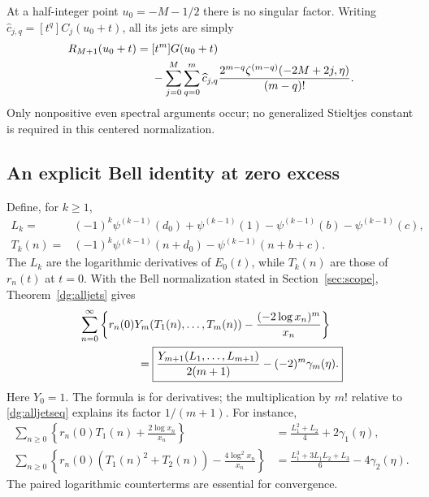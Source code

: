 At a half-integer point $u_0=-M-1/2$ there is no singular factor.
Writing $\widehat c_{j,q}=[t^q]C_j(u_0+t)$, all its jets are simply
\begin{align}
 [t^m]R_{M+1}(u_0+t)
 ={}&[t^m]G(u_0+t)\notag\\
 &-\sum_{j=0}^{M}\sum_{q=0}^{m}\widehat c_{j,q}
       \frac{2^{m-q}\zeta^{(m-q)}(-2M+2j,\eta)}{(m-q)!}.
 \label{dg:halfjets}
\end{align}
Only nonpositive even spectral arguments occur; no generalized
Stieltjes constant is required in this centered normalization.

\subsection{An explicit Bell identity at zero excess}
Define, for $k\ge1$,
\begin{align}
 L_k={}&(-1)^k\psi^{(k-1)}(d_0)+\psi^{(k-1)}(1)
                    -\psi^{(k-1)}(b)-\psi^{(k-1)}(c),
                    \label{dg:Lk}\\
 T_k(n)={}&(-1)^k\psi^{(k-1)}(n+d_0)
                    -\psi^{(k-1)}(n+b+c).
                    \label{dg:Tk}
\end{align}
The $L_k$ are the logarithmic derivatives of $E_0(t)$, while $T_k(n)$
are those of $r_n(t)$ at $t=0$. With the Bell normalization stated
in Section~\ref{sec:scope}, Theorem~\ref{dg:alljets} gives
\begin{align}
 &\sum_{n=0}^{\infty}\left\{
 r_n(0)Y_m(T_1(n),\ldots,T_m(n))
              -\frac{(-2\log x_n)^m}{x_n}\right\}\notag\\
 &\hspace{18mm}=
 \boxed{\frac{Y_{m+1}(L_1,\ldots,L_{m+1})}{2(m+1)}
              -(-2)^m\gamma_m(\eta).}\label{dg:Bellzero}
\end{align}
Here $Y_0=1$. The formula is for derivatives; the multiplication by
$m!$ relative to \eqref{dg:alljetseq} explains its factor $1/(m+1)$.
For instance,
\begin{align}
 \sum_{n\ge0}\left\{r_n(0)T_1(n)+\frac{2\log x_n}{x_n}\right\}
 &=\frac{L_1^2+L_2}{4}+2\gamma_1(\eta),\label{dg:Bellone}\\
 \sum_{n\ge0}\left\{r_n(0)(T_1(n)^2+T_2(n))
                    -\frac{4\log^2x_n}{x_n}\right\}
 &=\frac{L_1^3+3L_1L_2+L_3}{6}-4\gamma_2(\eta).
 \label{dg:Belltwo}
\end{align}
The paired logarithmic counterterms are essential for convergence.

